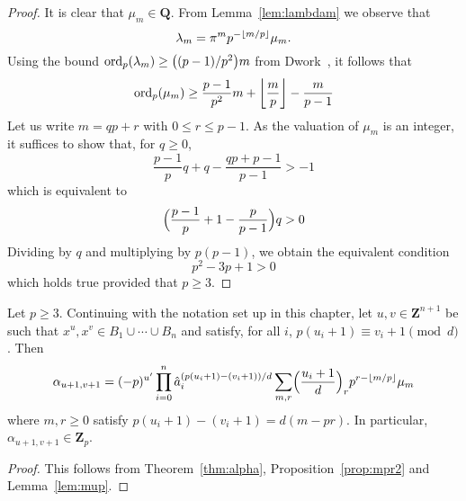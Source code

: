\begin{proof}
It is clear that $\mu_m \in \mathbf{Q}$.  From Lemma~\ref{lem:lambdam} 
we observe that 
\begin{equation*}
\lambda_m = \pi^m p^{- \left\lfloor m/p\right\rfloor} \mu_m.
\end{equation*}
Using the bound $\operatorname{ord}_p(\lambda_m) \geq \bigl((p-1)/p^2\bigr) m$ 
from Dwork~\citep[Pages~55--57]{Dwork62}, it follows that 
\begin{equation*}
\operatorname{ord}_p (\mu_m) \geq \frac{p-1}{p^2} m + \left\lfloor\frac{m}{p}\right\rfloor - \frac{m}{p-1}
\end{equation*}
Let us write $m = q p + r$ with $0 \leq r \leq p-1$.  As the valuation 
of $\mu_m$ is an integer, it suffices to show that, for $q \geq 0$, 
\begin{equation*}
\frac{p-1}{p} q + q - \frac{q p + p - 1}{p - 1} > -1
\end{equation*}
which is equivalent to 
\begin{equation*}
\Bigl( \frac{p-1}{p} + 1 - \frac{p}{p - 1} \Bigr) q > 0
\end{equation*}
Dividing by $q$ and multiplying by $p (p-1)$, we obtain the equivalent 
condition
\begin{equation*}
p^2 - 3p + 1 > 0
\end{equation*}
which holds true provided that $p \geq 3$.
\end{proof}

\begin{thm} \label{thm:alphap}
Let $p \geq 3$.  Continuing with the notation set up in this chapter, 
let $u, v \in \mathbf{Z}^{n+1}$ be such that 
$x^u, x^v \in B_1 \cup \dotsb \cup B_n$ and satisfy, 
for all $i$, $p (u_i + 1) \equiv v_i + 1 \pmod{d}$. 
Then 
\begin{equation} \label{eq:alphap.0}
\alpha_{u+1,v+1} = (-p)^{u'} \prod_{i=0}^n 
    \hat{a}_i^{(p (u_i + 1) - (v_i + 1))/d} \sum_{m,r} 
    \Bigl(\frac{u_i+1}{d}\Bigr)_r p^{r - \left\lfloor m/p\right\rfloor} \mu_m
\end{equation}
where $m, r \geq 0$ satisfy $p (u_i + 1) - (v_i + 1) = d (m - pr)$. 
In particular, $\alpha_{u+1, v+1} \in \mathbf{Z}_p$. 
\end{thm}

\begin{proof}
This follows from Theorem~\ref{thm:alpha}, Proposition~\ref{prop:mpr2} 
and Lemma~\ref{lem:mup}.
\end{proof}


